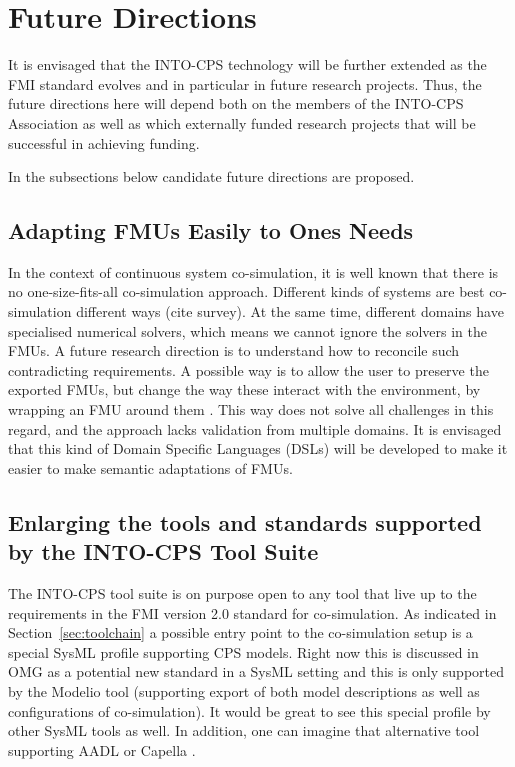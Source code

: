 %
%
%
\section{Future Directions}\label{sec:future}


It is envisaged that the INTO-CPS technology will be further extended as the FMI standard evolves and in particular in future research projects. 
Thus, the future directions here will depend both on the members of the INTO-CPS Association as well as which externally funded research projects that will be successful in achieving funding. 

In the subsections below candidate future directions are proposed.

\subsection{Adapting FMUs Easily to Ones Needs}

In the context of continuous system co-simulation, it is well known that there is no one-size-fits-all co-simulation approach. 
Different kinds of systems are best co-simulation different ways (cite survey).
At the same time, different domains have specialised numerical solvers, which means we cannot ignore the solvers in the FMUs.
A future research direction is to understand how to reconcile such contradicting requirements.
A possible way is to allow the user to preserve the exported FMUs, but change the way these interact with the environment, by wrapping an FMU around them \cite{Gomes&18a}.
This way does not solve all challenges in this regard, and the approach lacks validation from multiple domains. It is envisaged that this kind of Domain Specific Languages (DSLs) will be developed to make it easier to make semantic adaptations of FMUs.


\subsection{Enlarging the tools and standards supported by the INTO-CPS Tool Suite}

The INTO-CPS tool suite is on purpose open to any tool that live up to the requirements in the FMI version 2.0 standard for co-simulation. As indicated in Section~\ref{sec:toolchain} a possible entry point to the co-simulation setup is a special SysML profile supporting CPS models. Right now this is discussed in OMG as a potential new standard in a SysML setting and this is only supported by the Modelio tool (supporting export of both model descriptions as well as configurations of co-simulation). It would be great to see this special profile by other SysML tools as well. In addition, one can imagine that alternative tool supporting AADL \cite{AADL04} or Capella \cite{Roques17}.

